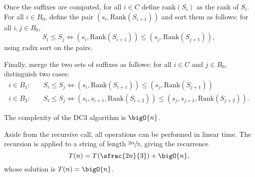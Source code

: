 \documentclass{subfiles}
\begin{document}
    Once the suffixes are computed, for all \(i \in C\) define 
        \(\mathrm{rank}(S_{i})\) as the rank of \(S_{i}\). 
        For all \(i \in B_{0}\), define the pair 
        \((s_{i}, \mathrm{Rank}(S_{i + 1}))\) and sort them as follows: for all 
        \(i, j \in B_{0}\),
        \[
            S_{i} \le S_{j} \iff (s_{i}, \mathrm{Rank}(S_{i + 1})) \le 
            (s_{j}, \mathrm{Rank}(S_{j + 1})),
        \]
        using radix sort on the pairs.

    Finally, merge the two sets of suffixes as follows: for all \(i \in C\) 
        and \(j \in B_{0}\), distinguish two cases:
        \[
        \begin{aligned}
            i \in B_{1}: &\quad S_{i} \le S_{j} \iff 
                (s_{i}, \mathrm{Rank}(S_{i + 1})) \le (s_{j}, \mathrm{Rank}(S_{j + 1})) \\
            i \in B_{2}: &\quad S_{i} \le S_{j} \iff 
                (s_{i}, s_{i + 1}, \mathrm{Rank}(S_{i + 2})) \le 
                (s_{j}, s_{j + 1}, \mathrm{Rank}(S_{j + 2})).
        \end{aligned}
        \]

    \begin{theorem*}
        The complexity of the DC3 algorithm is \(\bigO{n}\).
    \end{theorem*}

    \begin{proof*}
        Aside from the recursive call, all operations can be performed in linear 
        time. The recursion is applied to a string of length \(\sfrac{2n}{3}\), 
        giving the recurrence
        \[
            T(n) = T(\sfrac{2n}{3}) + \bigO{n},
        \]
        whose solution is \(T(n) = \bigO{n}\).
    \end{proof*}
\end{document}
